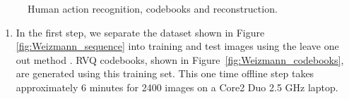 \documentclass[12pt,letterpaper,doublespaced,ETD,proposal]{gt-ece-thesis}
\begin{document}
\begin{Body}
			\begin{figure}%
						\centering	
						\hspace{1in}
						\caption{Human action recognition, codebooks and reconstruction.} 
						\label{fig:Weizmann_codebooks_and_reconstruction}				
			\end{figure}
			
\begin{enumerate}			
\item In the first step, we separate the dataset shown in Figure \ref{fig:Weizmann_sequence} into training and test images using the leave one out method \cite{2000_JNL_SURVEYprml_Jain}.  RVQ codebooks, shown in Figure~\ref{fig:Weizmann_codebooks}, are generated using this training set.  This one time offline step takes approximately 6 minutes for 2400 images on a Core2 Duo 2.5 GHz laptop.  


\end{enumerate}
\end{Body}
\end{document}
